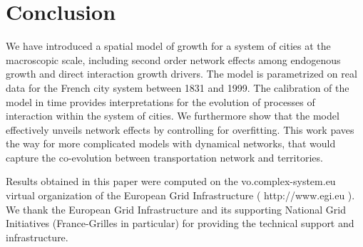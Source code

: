 \documentclass[Royal,sageh,times]{sagej}
\begin{document}
\section*{Conclusion}


We have introduced a spatial model of growth for a system of cities at the macroscopic scale, including second order network effects among endogenous growth and direct interaction growth drivers. The model is parametrized on real data for the French city system between 1831 and 1999. The calibration of the model in time provides interpretations for the evolution of processes of interaction within the system of cities. We furthermore show that the model effectively unveils network effects by controlling for overfitting. This work paves the way for more complicated models with dynamical networks, that would capture the co-evolution between transportation network and territories.




\begin{acks}
 Results obtained in this paper were computed on the vo.complex-system.eu virtual organization of the European Grid Infrastructure ( http://www.egi.eu ). We thank the European Grid Infrastructure and its supporting National Grid Initiatives (France-Grilles in particular) for providing the technical support and infrastructure.
\end{acks}
\end{document}
